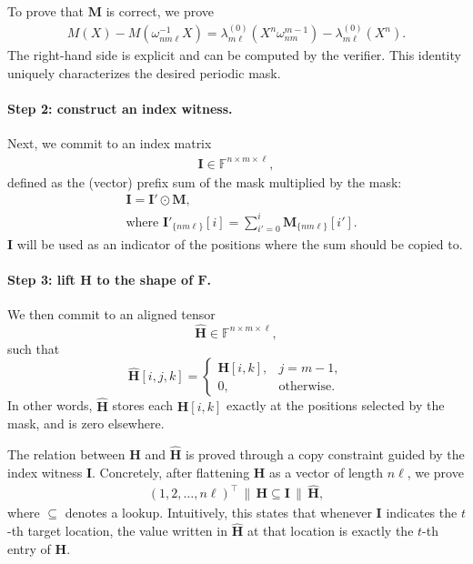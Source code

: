 To prove that $\mathbf{M}$ is correct, we prove
\begin{align}
    M(X)-M(\omega_{nm\ell}^{-1}X)
    =
    \lambda_{m\ell}^{(0)}(X^n\omega_{nm}^{m-1})-\lambda_{m\ell}^{(0)}(X^n).
\end{align}
The right-hand side is explicit and can be
computed by the verifier. This identity uniquely characterizes the desired
periodic mask.

\paragraph{Step 2: construct an index witness.}
Next, we commit to an index matrix
\begin{align}
    \mathbf{I}\in\mathbb{F}^{n\times m\times \ell},
\end{align}
defined as the (vector) prefix sum of the mask multiplied by the mask:
\begin{align}
  &\mathbf{I} = \mathbf{I}'\odot \mathbf{M},\\
  &\text{where } \mathbf{I}'_{\{nm\ell\}}[i] = \sum_{i'=0}^{i}\mathbf{M}_{\{nm\ell\}}[i'].
\end{align}
$\mathbf{I}$ will be used as an indicator of the positions 
where the sum should be copied to.

\paragraph{Step 3: lift $\mathbf{H}$ to the shape of $\mathbf{F}$.}
We then commit to an aligned tensor
\[
    \widehat{\mathbf{H}}\in\mathbb{F}^{n\times m\times \ell},
\]
such that
\[
    \widehat{\mathbf{H}}[i,j,k]
    =
    \begin{cases}
        \mathbf{H}[i,k], & j=m-1,\\
        0, & \text{otherwise}.
    \end{cases}
\]
In other words, $\widehat{\mathbf{H}}$ stores each $\mathbf{H}[i,k]$ exactly at the
positions selected by the mask, and is zero elsewhere.

The relation between $\mathbf{H}$ and $\widehat{\mathbf{H}}$ is proved through a copy
constraint guided by the index witness $\mathbf{I}$. Concretely, after
flattening $\mathbf{H}$ as a vector of length $n\ell$, we prove
\begin{align}
    (1,2,\dots,n\ell)^\top \,\|\, \mathbf{H}
    \subseteq
    \mathbf{I} \,\|\, \widehat{\mathbf{H}},\label{eq:copy-constraint-H-Hhat}
\end{align}
where $\subseteq$ denotes a lookup. Intuitively, this states that whenever
$\mathbf{I}$ indicates the $t$-th target location, the value written in
$\widehat{\mathbf{H}}$ at that location is exactly the $t$-th entry of $\mathbf{H}$.

